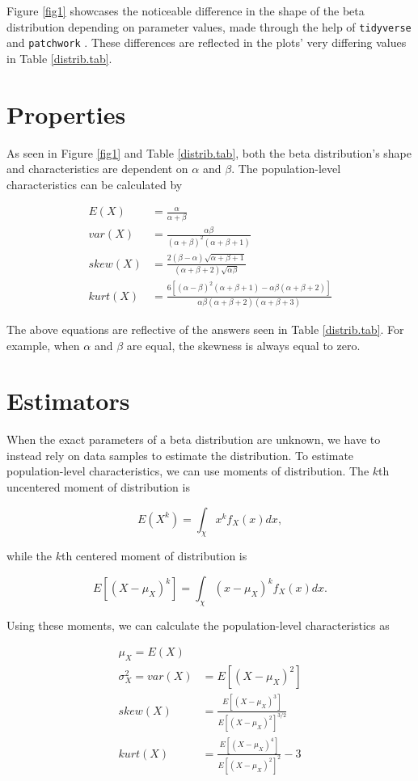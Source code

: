 \documentclass{article}\usepackage[]{graphicx}\usepackage[]{xcolor}
\begin{document}
\begin{multicols}{2}
Figure \ref{fig1} showcases the noticeable difference in the shape of the beta distribution depending on parameter values, made through the help of \texttt{tidyverse} and \texttt{patchwork} \citep{tidyverse, patchwork}. These differences are reflected in the plots' very differing values in Table \ref{distrib.tab}. 


\section{Properties}
As seen in Figure \ref{fig1} and Table \ref{distrib.tab}, both the beta distribution's shape and characteristics are dependent on $\alpha$ and $\beta$. The population-level characteristics can be calculated by

\begin{align*}
E(X) &= \frac{\alpha}{\alpha + \beta} \tag{The Mean} \\
var(X) &= \frac{\alpha\beta}{(\alpha + \beta)^2(\alpha + \beta + 1)} \tag{The variance} \\
skew(X) &= \frac{2(\beta-\alpha)\sqrt{\alpha + \beta + 1}}{(\alpha + \beta + 2)\sqrt{\alpha\beta}} \tag{The Skewness} \\
kurt(X) &= \frac{6[(\alpha-\beta)^2(\alpha+\beta+1)-\alpha\beta(\alpha+\beta+2)]}{\alpha\beta(\alpha+\beta+2)(\alpha+\beta+3)} \tag{The Excess Kurtosis}
\end{align*}

The above equations are reflective of the answers seen in Table \ref{distrib.tab}. For example, when $\alpha$ and $\beta$ are equal, the skewness is always equal to zero.

\section{Estimators}
When the exact parameters of a beta distribution are unknown, we have to instead rely on data samples to estimate the distribution. To estimate population-level characteristics, we can use moments of distribution. The $k$th uncentered moment of distribution is 

\[E(X^k) = \int_\chi x^kf_X(x)dx,\]

while the $k$th centered moment of distribution is

\[E[(X-\mu_X)^k] = \int_\chi (x-\mu_X)^kf_X(x)dx.\]

Using these moments, we can calculate the population-level characteristics as

\begin{align*}
\mu_X = E(X) & \tag{The Mean} \\ 
\sigma^2_X = var(X) &= E[(X-\mu_X)^2] \tag{The Variance} \\
skew(X) &= \frac{E[(X-\mu_X)^3]}{E[(X-\mu_X)^2]^{3/2}} \tag{The Skewness} \\
kurt(X) &= \frac{E[(X-\mu_X)^4]}{E[(X-\mu_X)^2]^2}-3 \tag{The Excess Kurtosis}
\end{align*}


\end{multicols}
\end{document}
